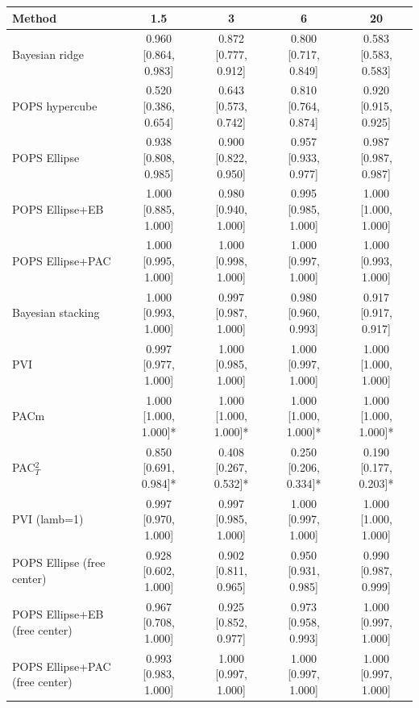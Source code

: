 \begin{tabular}{lcccc}
\toprule
Method & 1.5 & 3 & 6 & 20 \\
\midrule
Bayesian ridge & 0.960 {\scriptsize[0.864, 0.983]} & 0.872 {\scriptsize[0.777, 0.912]} & 0.800 {\scriptsize[0.717, 0.849]} & 0.583 {\scriptsize[0.583, 0.583]} \\
POPS hypercube & 0.520 {\scriptsize[0.386, 0.654]} & 0.643 {\scriptsize[0.573, 0.742]} & 0.810 {\scriptsize[0.764, 0.874]} & 0.920 {\scriptsize[0.915, 0.925]} \\
POPS Ellipse & 0.938 {\scriptsize[0.808, 0.985]} & 0.900 {\scriptsize[0.822, 0.950]} & 0.957 {\scriptsize[0.933, 0.977]} & 0.987 {\scriptsize[0.987, 0.987]} \\
POPS Ellipse+EB & 1.000 {\scriptsize[0.885, 1.000]} & 0.980 {\scriptsize[0.940, 1.000]} & 0.995 {\scriptsize[0.985, 1.000]} & 1.000 {\scriptsize[1.000, 1.000]} \\
POPS Ellipse+PAC & 1.000 {\scriptsize[0.995, 1.000]} & 1.000 {\scriptsize[0.998, 1.000]} & 1.000 {\scriptsize[0.997, 1.000]} & 1.000 {\scriptsize[0.993, 1.000]} \\
Bayesian stacking & 1.000 {\scriptsize[0.993, 1.000]} & 0.997 {\scriptsize[0.987, 1.000]} & 0.980 {\scriptsize[0.960, 0.993]} & 0.917 {\scriptsize[0.917, 0.917]} \\
PVI & 0.997 {\scriptsize[0.977, 1.000]} & 1.000 {\scriptsize[0.985, 1.000]} & 1.000 {\scriptsize[0.997, 1.000]} & 1.000 {\scriptsize[1.000, 1.000]} \\
PACm & 1.000 {\scriptsize[1.000, 1.000]}* & 1.000 {\scriptsize[1.000, 1.000]}* & 1.000 {\scriptsize[1.000, 1.000]}* & 1.000 {\scriptsize[1.000, 1.000]}* \\
PAC$^2_T$ & 0.850 {\scriptsize[0.691, 0.984]}* & 0.408 {\scriptsize[0.267, 0.532]}* & 0.250 {\scriptsize[0.206, 0.334]}* & 0.190 {\scriptsize[0.177, 0.203]}* \\
PVI (lamb=1) & 0.997 {\scriptsize[0.970, 1.000]} & 0.997 {\scriptsize[0.985, 1.000]} & 1.000 {\scriptsize[0.997, 1.000]} & 1.000 {\scriptsize[1.000, 1.000]} \\
POPS Ellipse (free center) & 0.928 {\scriptsize[0.602, 1.000]} & 0.902 {\scriptsize[0.811, 0.965]} & 0.950 {\scriptsize[0.931, 0.985]} & 0.990 {\scriptsize[0.987, 0.999]} \\
POPS Ellipse+EB (free center) & 0.967 {\scriptsize[0.708, 1.000]} & 0.925 {\scriptsize[0.852, 0.977]} & 0.973 {\scriptsize[0.958, 0.993]} & 1.000 {\scriptsize[0.997, 1.000]} \\
POPS Ellipse+PAC (free center) & 0.993 {\scriptsize[0.983, 1.000]} & 1.000 {\scriptsize[0.997, 1.000]} & 1.000 {\scriptsize[0.997, 1.000]} & 1.000 {\scriptsize[0.997, 1.000]} \\
\bottomrule
\end{tabular}


